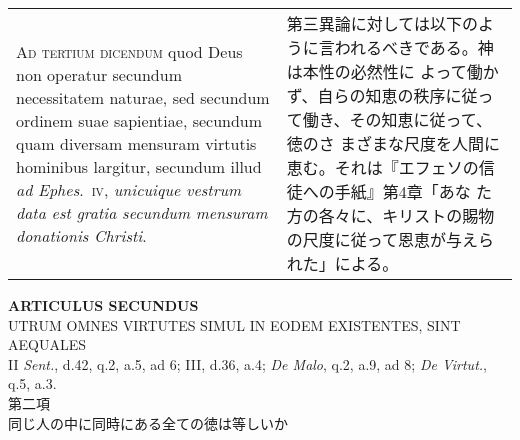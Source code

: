 \documentclass[10pt]{jsarticle}
\begin{document}
\begin{longtable}{p{21em}p{21em}}
\\

 {\scshape Ad tertium dicendum} quod Deus non operatur secundum
 necessitatem naturae, sed secundum ordinem suae sapientiae, secundum
 quam diversam mensuram virtutis hominibus largitur, secundum illud
 {\itshape ad Ephes}.~{\scshape iv}, {\itshape unicuique vestrum data
 est gratia secundum mensuram donationis Christi}.

 &

 第三異論に対しては以下のように言われるべきである。神は本性の必然性に
 よって働かず、自らの知恵の秩序に従って働き、その知恵に従って、徳のさ
 まざまな尺度を人間に恵む。それは『エフェソの信徒への手紙』第4章「あな
 た方の各々に、キリストの賜物の尺度に従って恩恵が与えられた」による。

 
\end{longtable}
\newpage


\begin{center}
{\Large {\bf ARTICULUS SECUNDUS}}\\
{\large UTRUM OMNES VIRTUTES SIMUL IN EODEM EXISTENTES, SINT AEQUALES}\\
{\footnotesize II {\itshape Sent.}, d.42, q.2, a.5, ad 6; III, d.36, a.4; {\itshape De Malo}, q.2, a.9, ad 8; {\itshape De Virtut.}, q.5, a.3.}\\
{\Large 第二項\\同じ人の中に同時にある全ての徳は等しいか}
\end{center}
\end{document}
